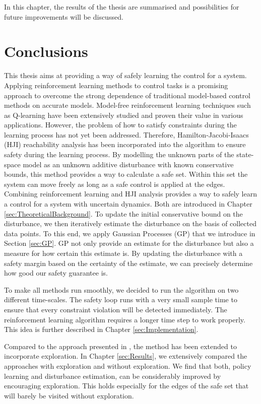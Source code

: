 \documentclass[../main.tex]{subfiles}
\begin{document}
In this chapter, the results of the thesis are summarised and possibilities for future improvements will be discussed. 
\section{Conclusions}
This thesis aims at providing a way of safely learning the control for a system. Applying reinforcement learning methods to control tasks is a promising approach to overcome the strong dependence of traditional model-based control methods on accurate models. Model-free reinforcement learning techniques such as Q-learning have been extensively studied and proven their value in various applications. However, the problem of how to satisfy constraints during the learning process has not yet been addressed. Therefore, Hamilton-Jacobi-Isaacs (HJI) reachability analysis has been incorporated into the algorithm to ensure safety during the learning process. By modelling the unknown parts of the state-space model as an unknown additive disturbance with known conservative bounds, this method provides a way to calculate a safe set. Within this set the system can move freely as long as a safe control is applied at the edges. Combining reinforcement learning and HJI analysis provides a way to safely learn a control for a system with uncertain dynamics. Both are introduced in Chapter \ref{sec:TheoreticalBackground}. To update the initial conservative bound on the disturbance, we then iteratively estimate the disturbance on the basis of collected data points. To this end, we apply Gaussian Processes (GP) that we introduce in Section \ref{sec:GP}. GP not only provide an estimate for the disturbance but also a measure for how certain this estimate is. By updating the disturbance with a safety margin based on the certainty of the estimate, we can precisely determine how good our safety guarantee is. \par
To make all methods run smoothly, we decided to run the algorithm on two different time-scales. The safety loop runs with a very small sample time to ensure that every constraint violation will be detected immediately. The reinforcement learning algorithm requires a longer time step to work properly. This idea is further described in Chapter \ref{sec:Implementation}.\par

Compared to the approach presented in \cite{akametalu2014reachability}, the method has been extended to incorporate exploration. In Chapter \ref{sec:Results}, we extensively compared the approaches with exploration and without exploration. We find that both, policy learning and disturbance estimation, can be considerably improved by encouraging exploration. This holds especially for the edges of the safe set that will barely be visited without exploration. 
\end{document}
